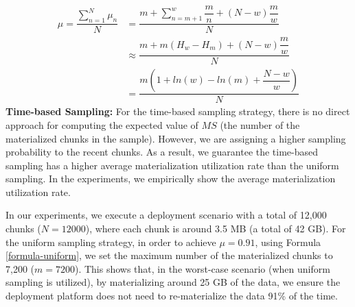 \begin{equation} \label{formula-window-based}
\begin{aligned}
\mu=\dfrac{\sum\limits_{n=1}^N \mu_n}{N}
&=\dfrac{m + \sum\limits_{n = m+1}^{w} \dfrac{m}{n} + (N-w)\dfrac{m}{w}}{N} \\
&\approx\dfrac{m  +  m (H_w - H_{m}) + (N-w)\dfrac{m}{w}}{N}\\
&=\dfrac{m(1 + ln(w) - ln(m) + \dfrac{N-w}{w})}{N}
\end{aligned}
\end{equation}
\textbf{Time-based Sampling:}
For the time-based sampling strategy, there is no direct approach for computing the expected value of $MS$ (the number of the materialized chunks in the sample).
However, we are assigning a higher sampling probability to the recent chunks.
As a result, we guarantee the time-based sampling has a higher average materialization utilization rate than the uniform sampling.
In the experiments, we empirically show the average materialization utilization rate.

In our experiments, we execute a deployment scenario with a total of 12,000 chunks ($N = 12000$), where each chunk is around 3.5 MB (a total of 42 GB).
For the uniform sampling strategy, in order to achieve $\mu = 0.91$, using Formula \ref{formula-uniform}, we set the maximum number of the materialized chunks to 7,200 ($m=7200$).
This shows that, in the worst-case scenario (when uniform sampling is utilized), by materializing around 25 GB of the data, we ensure the deployment platform does not need to re-materialize the data 91\% of the time.



